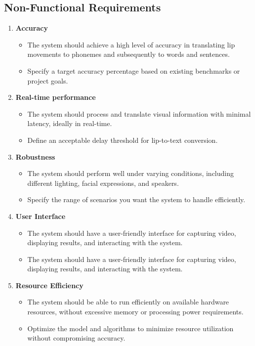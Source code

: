 \subsection{Non-Functional Requirements}
\begin{enumerate}
\item \textbf{Accuracy}
\begin{itemize}
\item The system should achieve a high level of accuracy in translating lip movements to phonemes and subsequently to words and sentences.  
\item Specify a target accuracy percentage based on existing benchmarks or project goals. 


\end{itemize}
\item \textbf{Real-time performance}
\begin{itemize}
\item The system should process and translate visual information with minimal latency, ideally in real-time.  
\item Define an acceptable delay threshold for lip-to-text conversion. 


\end{itemize}
\item \textbf{Robustness}
\begin{itemize}
\item The system should perform well under varying conditions, including different lighting, facial expressions, and speakers.   
\item Specify the range of scenarios you want the system to handle efficiently. 


\end{itemize}
\item \textbf{User Interface}
\begin{itemize}
\item The system should have a user-friendly interface for capturing video, displaying results, and interacting with the system.   
\item The system should have a user-friendly interface for capturing video, displaying results, and interacting with the system. 


\end{itemize}

\item \textbf{Resource Efficiency}
\begin{itemize}
\item The system should be able to run efficiently on available hardware resources, without excessive memory or processing power requirements.    
\item Optimize the model and algorithms to minimize resource utilization without compromising accuracy.


\end{itemize}

\end{enumerate}
